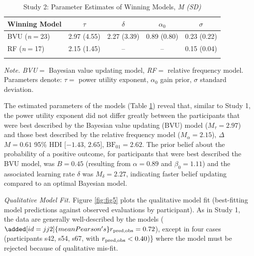 \documentclass[
  a4paper, man, floatsintext]{apa6}
\begin{document}
\begin{table}[tbp]

\begin{center}
\begin{threeparttable}

\caption{\label{tab:parameter_study2}Study 2: Parameter Estimates of Winning Models, \textit{M (SD)}}

\begin{tabular}{lcccc}
\toprule
Winning Model & $\tau$ & $\delta$ & $\alpha_0$ & $\sigma$\\
\midrule
BVU (\textit{n}$=$23) & 2.97 (4.55) & 2.27 (3.39) & 0.89 (0.80) & 0.23 (0.22)\\
RF (\textit{n}$=$17) & 2.15 (1.45) & -- & -- & 0.15 (0.04)\\
\bottomrule
\addlinespace
\end{tabular}

\begin{tablenotes}[para]
\normalsize{\textit{Note.} \textit{BVU}$=$ Bayesian value updating model, \textit{RF}$=$ relative frequency model. Parameters denote: $\tau=$ power utility exponent, $\alpha_0$ gain prior, $\sigma$ standard deviation.}
\end{tablenotes}

\end{threeparttable}
\end{center}

\end{table}

The estimated parameters of the models (Table
\ref{tab:parameter_study2}) reveal that, similar to Study 1, the power
utility exponent did not differ greatly between the participants that
were best described by the Bayesian value updating (BVU) model
(\(M_{\tau}= 2.97\)) and those best described by the relative frequency
model (\(M_{\alpha}=2.15\)), \(\Delta\) \(M = 0.61\) 95\% HDI
\([-1.43\), \(2.65]\), \(\mathrm{BF}_{\textrm{01}} = 2.62\). The prior
belief about the probability of a positive outcome, for participants
that were best described the BVU model, was \(B = 0.45\) (resulting from
\(\alpha = 0.89\) and \(\beta_0 = 1.11\)) and the associated learning
rate \(\delta\) was \(M_{\delta}=2.27\), indicating faster belief
updating compared to an optimal Bayesian model.

\textit{Qualitative Model Fit.} Figure \ref{fig:fig5} plots the
qualitative model fit (best-fitting model predictions against observed
evaluations by participant). As in Study 1, the data are generally
well-described by the models
(\(\added[id=jj2]{mean Pearson's} r\textsubscript{pred,obs} = 0.72\)),
except in four cases (participants s42, s54, s67, with
\(r\textsubscript{pred,obs} < 0.40\))\} where the model must be rejected
because of qualitative mis-fit.
\end{document}
